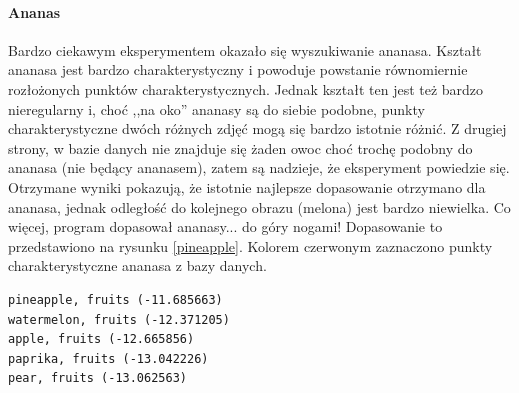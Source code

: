 \documentclass[a4paper,12pt,leqno]{article}
\begin{document}
\paragraph{Ananas}
Bardzo ciekawym eksperymentem okazało się wyszukiwanie ananasa. Kształt ananasa jest bardzo charakterystyczny i powoduje powstanie równomiernie
rozłożonych punktów charakterystycznych. Jednak kształt ten jest też bardzo nieregularny i, choć ,,na oko'' ananasy są do siebie podobne, punkty
charakterystyczne dwóch różnych zdjęć mogą się bardzo istotnie różnić. Z drugiej strony, w bazie danych nie znajduje się żaden owoc choć trochę
podobny do ananasa (nie będący ananasem), zatem są nadzieje, że eksperyment powiedzie się. Otrzymane wyniki pokazują, że istotnie najlepsze
dopasowanie otrzymano dla ananasa, jednak odległość do kolejnego obrazu (melona) jest bardzo niewielka. Co więcej, program dopasował ananasy...
do góry nogami! Dopasowanie to przedstawiono na rysunku \ref{pineapple}. Kolorem czerwonym zaznaczono punkty charakterystyczne ananasa z bazy danych.
\begin{verbatim}
pineapple, fruits (-11.685663)
watermelon, fruits (-12.371205)
apple, fruits (-12.665856)
paprika, fruits (-13.042226)
pear, fruits (-13.062563)
\end{verbatim}
\end{document}

